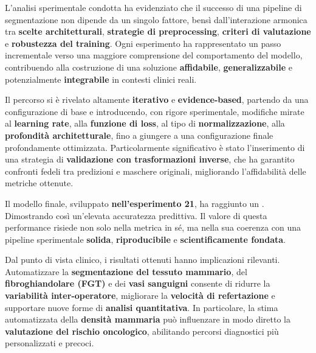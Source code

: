 


L’analisi sperimentale condotta ha evidenziato che il successo di una pipeline di segmentazione non dipende da un singolo fattore, bensì dall’interazione armonica tra \textbf{scelte architetturali}, \textbf{strategie di preprocessing}, \textbf{criteri di valutazione} e \textbf{robustezza del training}. Ogni esperimento ha rappresentato un passo incrementale verso una maggiore comprensione del comportamento del modello, contribuendo alla costruzione di una soluzione \textbf{affidabile}, \textbf{generalizzabile} e potenzialmente \textbf{integrabile} in contesti clinici reali.

Il percorso si è rivelato altamente \textbf{iterativo} e \textbf{evidence-based}, partendo da una configurazione di base e introducendo, con rigore sperimentale, modifiche mirate al \textbf{learning rate}, alla \textbf{funzione di loss}, al tipo di \textbf{normalizzazione}, alla \textbf{profondità architetturale}, fino a giungere a una configurazione finale profondamente ottimizzata. Particolarmente significativo è stato l’inserimento di una strategia di \textbf{validazione con trasformazioni inverse}, che ha garantito confronti fedeli tra predizioni e maschere originali, migliorando l’affidabilità delle metriche ottenute.


Il modello finale, sviluppato \textbf{nell’esperimento 21}, ha raggiunto un . Dimostrando così un'elevata accuratezza predittiva. Il valore di questa performance risiede non solo nella metrica in sé, ma nella sua coerenza con una pipeline sperimentale \textbf{solida}, \textbf{riproducibile} e \textbf{scientificamente fondata}.

Dal punto di vista clinico, i risultati ottenuti hanno implicazioni rilevanti. Automatizzare la \textbf{segmentazione del tessuto mammario}, del \textbf{fibroghiandolare (FGT)} e dei \textbf{vasi sanguigni} consente di ridurre la \textbf{variabilità inter-operatore}, migliorare la \textbf{velocità di refertazione} e supportare nuove forme di \textbf{analisi quantitativa}. In particolare, la stima automatizzata della \textbf{densità mammaria} può influenzare in modo diretto la \textbf{valutazione del rischio oncologico}, abilitando percorsi diagnostici più personalizzati e precoci.


